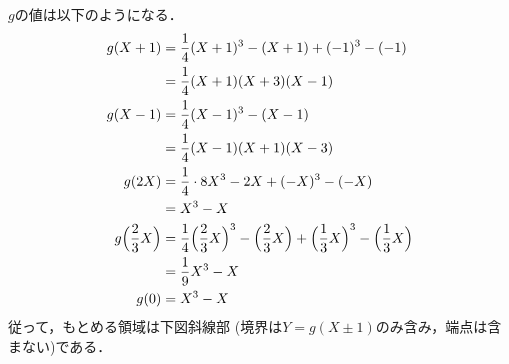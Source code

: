 \documentclass[../../main.tex]{subfiles}
\begin{document}
$g$の値は以下のようになる．
\begin{align}
  g(X+1) &= \dfrac{1}{4}(X+1)^3 - (X+1) + (-1)^3 - (-1) \\
  &= \dfrac{1}{4}(X+1)(X+3)(X-1) \label{eq:8} \\
  g(X-1) &= \dfrac{1}{4}(X-1)^3 - (X-1) \\
  &= \dfrac{1}{4}(X-1)(X+1)(X-3) \label{eq:9} \\
  g(2X) &= \dfrac{1}{4} \cdot 8 X^3 - 2X + (-X)^3 - (-X) \\
  &= X^3 - X \label{eq:10} \\
  g\Bigl(\dfrac{2}{3}X\Bigr) &= \dfrac{1}{4}\Bigl(\dfrac{2}{3}X\Bigr)^3 - \Bigl(\dfrac{2}{3}X\Bigr) + \Bigl(\dfrac{1}{3}X\Bigr)^3 - \Bigl(\dfrac{1}{3}X\Bigr) \\
  &= \dfrac{1}{9}X^3 - X \label{eq:11} \\
  g(0) &= X^3-X
\end{align}
従って，もとめる領域は下図斜線部 (境界は$Y=g(X\pm 1)$のみ含み，端点は含まない)である．
\end{document}

